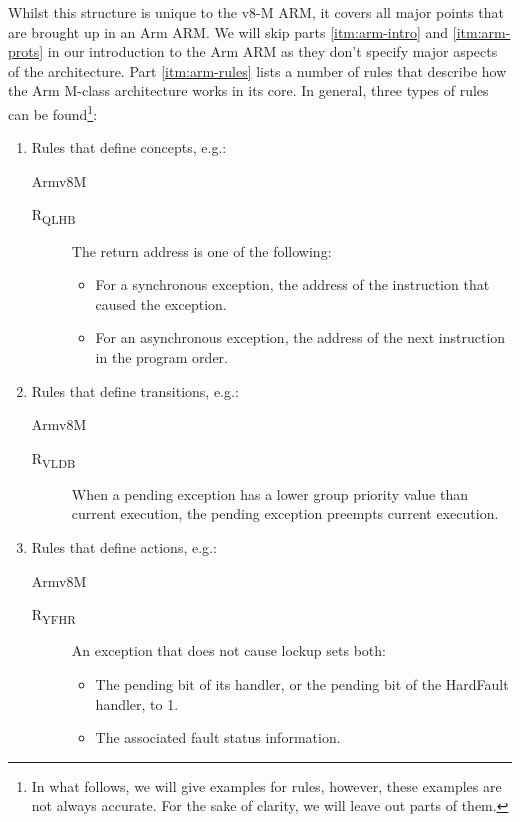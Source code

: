 \documentclass{securem}
\begin{document}
Whilst this structure is unique to the v8-M ARM, it covers all major points that are brought up in an Arm ARM.
We will skip parts \ref{itm:arm-intro} and \ref{itm:arm-prots} in our introduction to the Arm ARM as they don't specify major aspects of the architecture.
Part \ref{itm:arm-rules} lists a number of rules that describe how the Arm M-class architecture works in its core.
In general, three types of rules can be found\footnote{In what follows, we will give examples for rules, however, these examples are not always accurate. For the sake of clarity, we will leave out parts of them.}:
\begin{enumerate}
    \item Rules that define concepts, e.g.:
    \begin{displaycquote}{Armv8M}
        \begin{description}
            \item[R\textsubscript{QLHB}]
            The return address is one of the following:
            \begin{itemize}
                \item For a synchronous exception, \textelp{} the address of the instruction that caused the exception.
                \item For an asynchronous exception, the address of the next instruction in the program order. \textelp{}
            \end{itemize}
        \end{description}
    \end{displaycquote}

    \item Rules that define transitions, e.g.:
    \begin{displaycquote}{Armv8M}
        \begin{description}
            \item[R\textsubscript{VLDB}] When a pending exception has a lower group priority value than current execution, \textelp{} the pending exception preempts current execution.
        \end{description}
    \end{displaycquote}

    \item Rules that define actions, e.g.:
    \begin{displaycquote}{Armv8M}
        \begin{description}
            \item[R\textsubscript{YFHR}] An exception that does not cause lockup sets both:
            \begin{itemize}
                \item The pending bit of its handler, or the pending bit of the HardFault handler, to 1.
                \item The associated fault status information.
            \end{itemize}
        \end{description}
    \end{displaycquote}
\end{enumerate}
\end{document}
